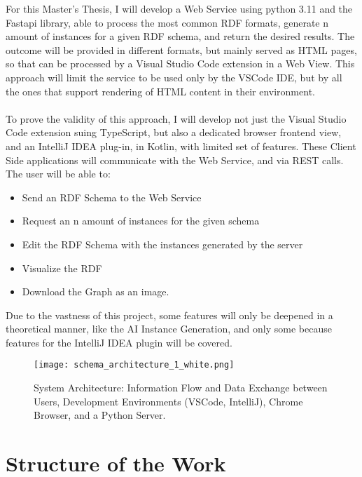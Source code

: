 For this Master's Thesis, I will develop a Web Service using python 3.11 and the Fastapi library, able to process the most common RDF formats, generate n amount of instances for a given RDF schema, and return the desired results. 
The outcome will be provided in different formats, but mainly served as HTML pages, so that can be processed by a Visual Studio Code extension in a Web View. This approach will limit the service to be used only by the VSCode IDE, but by all the ones that support rendering of HTML content in their environment.
\\
\\
To prove the validity of this approach, I will develop not just the Visual Studio Code extension suing TypeScript, but also a dedicated browser frontend view, and an IntelliJ IDEA plug-in, in Kotlin, with limited set of features. 
These Client Side applications will communicate with the Web Service, and via REST calls. The user will be able to: 
\begin{itemize}
      \item Send an RDF Schema to the Web Service
      \item Request an n amount of instances for the given schema
      \item Edit the RDF Schema with the instances generated by the server
      \item Visualize the RDF
      \item Download the Graph as an image. 
\end{itemize}
Due to the vastness of this project, some features will only be deepened in a theoretical manner, like the AI Instance Generation, and only some because features for the IntelliJ IDEA plugin will be covered.
\\
\begin{figure}[htb]
  \centering
  \texttt{[image: schema\_architecture\_1\_white.png]}\\
  \caption{System Architecture: Information Flow and Data Exchange between Users, Development Environments (VSCode, IntelliJ), Chrome Browser, and a Python Server.}\label{fig:intro}
\end{figure}

\section{Structure of the Work \label{sec:outline}}

